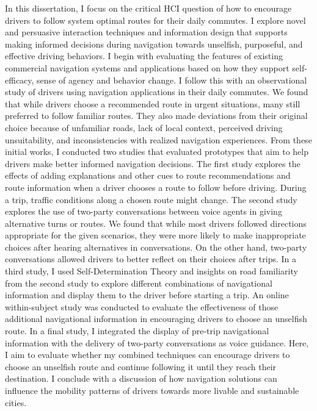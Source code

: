 In this dissertation, I focus on the critical HCI question of how to encourage drivers to follow system optimal routes for their daily commutes. I explore novel and persuasive interaction techniques and information design that supports making informed decisions during navigation towards unselfish, purposeful, and effective driving behaviors. I begin with evaluating the features of existing commercial navigation systems and applications based on how they support self-efficacy, sense of agency and behavior change. I follow this with an observational study of drivers using navigation applications in their daily commutes. We found that while drivers choose a recommended route in urgent situations, many still preferred to follow familiar routes. They also made deviations from their original choice because of unfamiliar roads, lack of local context, perceived driving unsuitability, and inconsistencies with realized navigation experiences. From these initial works, I conducted two studies that evaluated prototypes that aim to help drivers make better informed navigation decisions. The first study explores the effects of adding explanations and other cues to route recommendations and route information when a driver chooses a route to follow before driving. During a trip, traffic conditions along a chosen route might change. The second study explores the use of two-party conversations between voice agents in giving alternative turns or routes. We found that while most drivers followed directions appropriate for the given scenarios, they were more likely to make inappropriate choices after hearing alternatives in conversations. On the other hand, two-party conversations allowed drivers to better reflect on their choices after trips. In a third study, I used Self-Determination Theory and insights on road familiarity from the second study to explore different combinations of navigational information and display them to the driver before starting a trip. An online within-subject study was conducted to evaluate the effectiveness of those additional navigational information in encouraging drivers to choose an unselfish route. In a final study, I integrated the display of pre-trip navigational information with the delivery of two-party conversations as voice guidance. Here, I aim to evaluate whether my combined techniques can encourage drivers to choose an unselfish route and continue following it until they reach their destination. I conclude with a discussion of how navigation solutions can influence the mobility patterns of drivers towards more livable and sustainable cities.
